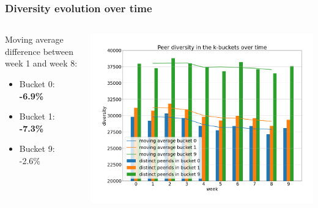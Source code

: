 \documentclass{pl-slide}
\begin{document}
\begin{frame}
\frametitle{Diversity evolution over time}

\begin{columns}[onlytextwidth]
\begin{column}{0.38\textwidth}
   Moving average difference between week 1 and week 8:
   \begin{itemize}
   		\item[] Bucket 0: \hspace{1em}\textbf{-6.9\%}
   		\item[] Bucket 1: \hspace{1em}\textbf{-7.3\%}
   		\item[] Bucket 9: \hspace{1em}-2.6\%
   \end{itemize}
\end{column}
\begin{column}{0.58\textwidth}
    \begin{center}
		\includegraphics[width=\textwidth]{plots/diversity-b0-b1-b9.png}
    \end{center}
\end{column}
\end{columns}
\end{frame}

\fi
\end{document}
